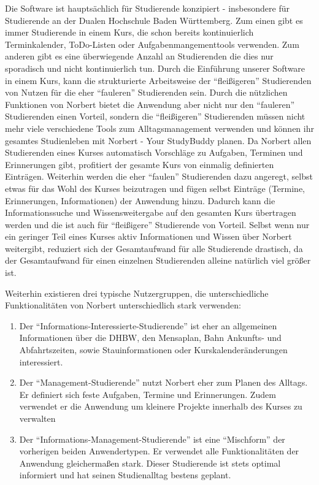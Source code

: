 Die Software ist hauptsächlich für Studierende konzipiert - insbesondere für Studierende an der Dualen Hochschule Baden Württemberg. Zum einen gibt es immer Studierende in einem Kurs, die schon bereits kontinuierlich Terminkalender, ToDo-Listen oder Aufgabenmangementtools verwenden. Zum anderen gibt es eine überwiegende Anzahl an Studierenden die dies nur sporadisch und nicht kontinuierlich tun. Durch die Einführung unserer Software in einem Kurs, kann die strukturierte Arbeitsweise der \enquote{fleißigeren} Studierenden von Nutzen für die eher \enquote{fauleren} Studierenden sein. Durch die nützlichen Funktionen von Norbert bietet die Anwendung aber nicht nur den \enquote{fauleren} Studierenden einen Vorteil, sondern die \enquote{fleißigeren} Studierenden müssen nicht mehr viele verschiedene Tools zum Alltagsmanagement verwenden und können ihr gesamtes Studienleben mit Norbert - Your StudyBuddy planen. Da Norbert allen Studierenden eines Kurses automatisch Vorschläge zu Aufgaben, Terminen und Erinnerungen gibt, profitiert der gesamte Kurs von einmalig definierten Einträgen. Weiterhin werden die eher \enquote{faulen} Studierenden dazu angeregt, selbst etwas für das Wohl des Kurses beizutragen und fügen selbst Einträge (Termine, Erinnerungen, Informationen) der Anwendung hinzu. Dadurch kann die Informationssuche und Wissensweitergabe auf den gesamten Kurs übertragen werden und die ist auch für \enquote{fleißigere} Studierende von Vorteil. Selbst wenn nur ein geringer Teil eines Kurses aktiv Informationen und Wissen über Norbert weitergibt, reduziert sich der Gesamtaufwand für alle Studierende drastisch, da der Gesamtaufwand für einen einzelnen Studierenden alleine natürlich viel größer ist.

Weiterhin existieren drei typische Nutzergruppen, die unterschiedliche Funktionalitäten von Norbert unterschiedlich stark verwenden:

\begin{enumerate}
	\item Der \enquote{Informations-Interessierte-Studierende} ist eher an allgemeinen Informationen über die DHBW, den Mensaplan, Bahn Ankunfts- und Abfahrtszeiten, sowie Stauinformationen oder Kurskalenderänderungen interessiert.
	
	\item Der \enquote{Management-Studierende} nutzt Norbert eher zum Planen des Alltags. Er definiert sich feste Aufgaben, Termine und Erinnerungen. Zudem verwendet er die Anwendung um kleinere Projekte innerhalb des Kurses zu verwalten
	
	\item Der \enquote{Informations-Management-Studierende} ist eine \enquote{Mischform} der vorherigen beiden Anwendertypen. Er verwendet alle Funktionalitäten der Anwendung gleichermaßen stark. Dieser Studierende ist stets optimal informiert und hat seinen Studienalltag bestens geplant. 
\end{enumerate}

